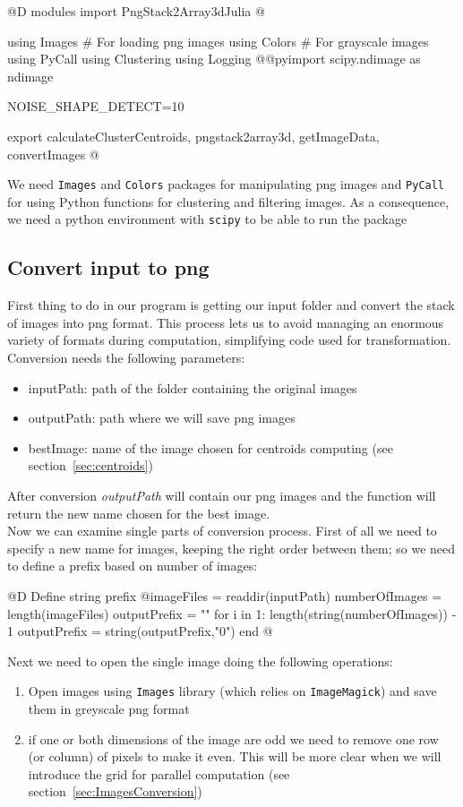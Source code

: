 \documentclass[11pt,oneside]{article}	%
\begin{document}
@D modules import PngStack2Array3dJulia
@{using Images # For loading png images
using Colors # For grayscale images
using PyCall
using Clustering
using Logging
@@pyimport scipy.ndimage as ndimage

NOISE_SHAPE_DETECT=10

export calculateClusterCentroids, pngstack2array3d, getImageData, convertImages
@}

We need \texttt{Images} and \texttt{Colors} packages for manipulating png images and \texttt{PyCall} for using Python functions for clustering and filtering images.
As a consequence, we need a python environment with \texttt{scipy} to be able to run the package

\subsection{Convert input to png}\label{sec:convertPNG}

First thing to do in our program is getting our input folder and convert the stack of images into png format. This process lets us to avoid managing an enormous variety of formats during computation, simplifying code used for transformation.\\

Conversion needs the following parameters:
\begin{itemize}
 \item inputPath: path of the folder containing the original images
 \item outputPath: path where we will save png images
 \item bestImage: name of the image chosen for centroids computing (see section~\ref{sec:centroids})
\end{itemize}

After conversion \textit{outputPath} will contain our png images and the function will return the new name chosen for the best image.\\

Now we can examine single parts of conversion process. First of all we need to specify a new name for images, keeping the right order between them; so we need to define a prefix based on number of images:

@D Define string prefix
@{imageFiles = readdir(inputPath)
numberOfImages = length(imageFiles)
outputPrefix = ""
for i in 1: length(string(numberOfImages)) - 1
  outputPrefix = string(outputPrefix,"0")
end @}
    
Next we need to open the single image doing the following operations:
\begin{enumerate}
 \item Open images using \texttt{Images} library (which relies on \texttt{ImageMagick}) and save them in greyscale png format 
 \item if one or both dimensions of the image are odd we need to remove one row (or column) of pixels to make it even. This will be more clear when we will introduce the grid for parallel computation (see section~\ref{sec:ImagesConversion})
\end{enumerate}
\end{document}
